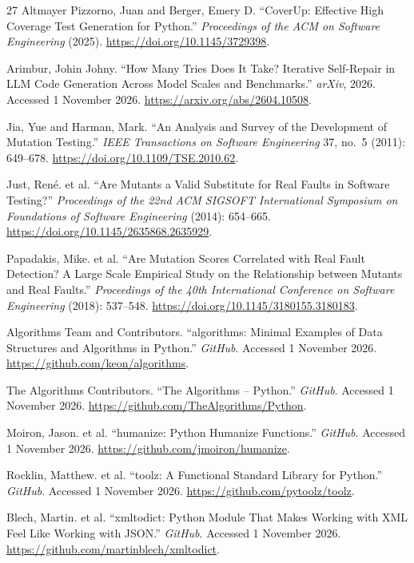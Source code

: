 \documentclass[11pt,a4paper]{article}
\begin{document}
\begin{thebibliography}{27}
Altmayer Pizzorno, Juan and Berger, Emery D. ``CoverUp: Effective High Coverage Test Generation for Python.'' \emph{Proceedings of the ACM on Software Engineering} (2025). \url{https://doi.org/10.1145/3729398}.

Arimbur, Johin Johny. ``How Many Tries Does It Take? Iterative Self-Repair in LLM Code Generation Across Model Scales and Benchmarks.'' \emph{arXiv}, 2026. Accessed 1 November 2026. \url{https://arxiv.org/abs/2604.10508}.

Jia, Yue and Harman, Mark. ``An Analysis and Survey of the Development of Mutation Testing.'' \emph{IEEE Transactions on Software Engineering} 37, no.~5 (2011): 649--678. \url{https://doi.org/10.1109/TSE.2010.62}.

Just, Ren{\'e}. et al. ``Are Mutants a Valid Substitute for Real Faults in Software Testing?'' \emph{Proceedings of the 22nd ACM SIGSOFT International Symposium on Foundations of Software Engineering} (2014): 654--665. \url{https://doi.org/10.1145/2635868.2635929}.

Papadakis, Mike. et al. ``Are Mutation Scores Correlated with Real Fault Detection? A Large Scale Empirical Study on the Relationship between Mutants and Real Faults.'' \emph{Proceedings of the 40th International Conference on Software Engineering} (2018): 537--548. \url{https://doi.org/10.1145/3180155.3180183}.

Algorithms Team and Contributors. ``algorithms: Minimal Examples of Data Structures and Algorithms in Python.'' \emph{GitHub}. Accessed 1 November 2026. \url{https://github.com/keon/algorithms}.

The Algorithms Contributors. ``The Algorithms -- Python.'' \emph{GitHub}. Accessed 1 November 2026. \url{https://github.com/TheAlgorithms/Python}.

Moiron, Jason. et al. ``humanize: Python Humanize Functions.'' \emph{GitHub}. Accessed 1 November 2026. \url{https://github.com/jmoiron/humanize}.

Rocklin, Matthew. et al. ``toolz: A Functional Standard Library for Python.'' \emph{GitHub}. Accessed 1 November 2026. \url{https://github.com/pytoolz/toolz}.

Blech, Martin. et al. ``xmltodict: Python Module That Makes Working with XML Feel Like Working with JSON.'' \emph{GitHub}. Accessed 1 November 2026. \url{https://github.com/martinblech/xmltodict}.


\end{thebibliography}
\end{document}
